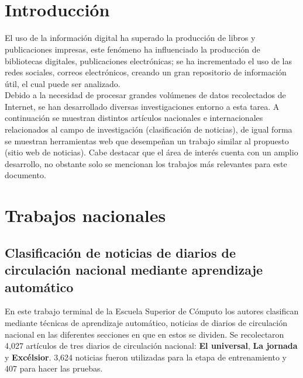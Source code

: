 \ \\\\
\section{Introducción}


El uso de la información digital ha superado la producción de libros y publicaciones impresas, este fenómeno ha influenciado la producción de bibliotecas digitales, publicaciones electrónicas; se ha incrementado el uso de las redes sociales, correos electrónicos, creando un gran repositorio de información útil, el cual puede ser analizado\citep{CD1}.\\

Debido a la necesidad de procesar grandes volúmenes de datos recolectados de Internet, se han desarrollado diversas investigaciones entorno a esta tarea. A continuación se muestran distintos artículos nacionales e internacionales relacionados al campo de investigación (clasificación de noticias), de igual forma se muestran herramientas web que desempeñan un trabajo similar al propuesto (sitio web de noticias). Cabe destacar que el área de interés cuenta con un amplio desarrollo, no obstante solo se mencionan los trabajos más relevantes para este documento.


\section{Trabajos nacionales}


\begin{large}
	 \subsection[Clasificación de noticias de diarios]{Clasificación de noticias de diarios de circulación nacional mediante aprendizaje automático }
\end{large}


En este trabajo terminal de la Escuela Superior de Cómputo \citep{CD2} los autores clasifican mediante técnicas de aprendizaje automático, noticias de diarios de circulación nacional en las diferentes secciones en que en estos se dividen. Se recolectaron 4,027 artículos de tres diarios de circulación nacional: \textbf{El universal}, \textbf{La jornada} y \textbf{Excélsior}. 3,624 noticias fueron utilizadas para la etapa de entrenamiento y 407 para hacer las pruebas.\\


